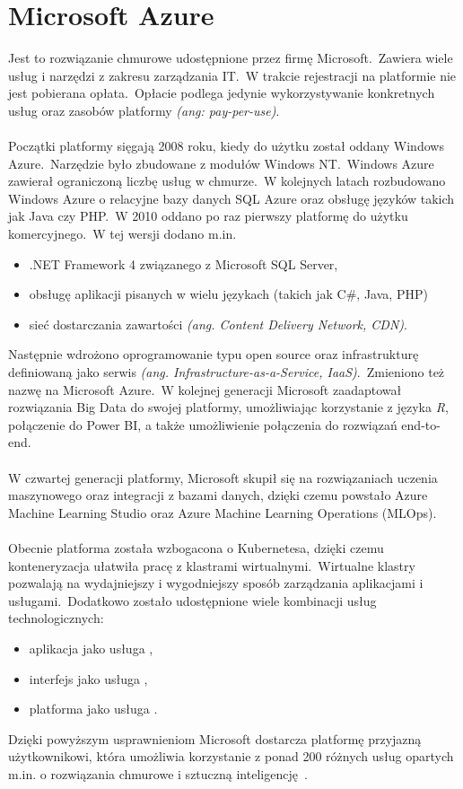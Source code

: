 \chapter{Microsoft Azure}
Jest to rozwiązanie chmurowe udostępnione przez firmę Microsoft.\ Zawiera wiele usług i narzędzi z zakresu zarządzania IT.\ W trakcie rejestracji na platformie nie jest pobierana opłata.\ Opłacie podlega jedynie wykorzystywanie konkretnych usług oraz zasobów platformy \textit{(ang: pay-per-use)}.
\\ \\
Początki platformy sięgają 2008 roku, kiedy do użytku został oddany Windows Azure.\ Narzędzie było zbudowane z modułów Windows NT.\ Windows Azure zawierał ograniczoną liczbę usług w chmurze.\ W kolejnych latach rozbudowano Windows Azure o relacyjne bazy danych SQL Azure oraz obsługę języków takich jak Java czy PHP.\ W 2010 oddano po raz pierwszy platformę do użytku komercyjnego.\ W tej wersji dodano m.in.
\begin{itemize}
\item .NET Framework 4 związanego z Microsoft SQL Server,
\item obsługę aplikacji pisanych w wielu językach (takich jak C\#, Java, PHP)
\item sieć dostarczania zawartości \textit{(ang. Content Delivery Network, CDN)}.
\end{itemize}
Następnie wdrożono oprogramowanie typu open source oraz infrastrukturę definiowaną jako serwis \textit{(ang. Infrastructure-as-a-Service, IaaS)}.\ Zmieniono też nazwę na Microsoft Azure.\ W kolejnej generacji Microsoft zaadaptował rozwiązania Big Data do swojej platformy, umożliwiając korzystanie z języka \textit{R}, połączenie do Power BI, a także umożliwienie połączenia do rozwiązań end-to-end.
\\ \\
W czwartej generacji platformy, Microsoft skupił się na rozwiązaniach uczenia maszynowego oraz integracji z bazami danych, dzięki czemu powstało Azure Machine Learning Studio oraz Azure Machine Learning Operations (MLOps).
\\ \\
Obecnie platforma została wzbogacona o Kubernetesa, dzięki czemu konteneryzacja ułatwiła pracę z klastrami wirtualnymi.\ Wirtualne klastry pozwalają na wydajniejszy i wygodniejszy sposób zarządzania aplikacjami i usługami.\ Dodatkowo zostało udostępnione wiele kombinacji usług technologicznych:

\begin{itemize}
    \item aplikacja jako usługa ,
    \item interfejs jako usługa ,
    \item platforma jako usługa .
\end{itemize}
Dzięki powyższym usprawnieniom Microsoft dostarcza platformę przyjazną użytkownikowi, która umożliwia korzystanie z ponad 200 różnych usług opartych m.in. o rozwiązania chmurowe i sztuczną inteligencję~\cite{Roosevelt2022, MicrosoftAzurec, Datashift}.

